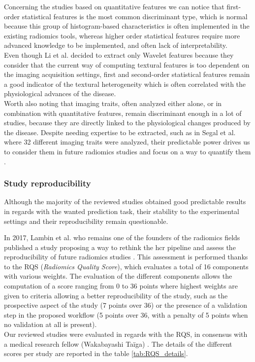 

Concerning the studies based on quantitative features we can notice that
first-order statistical features is the most common discriminant type,
which is normal because this group of histogram-based characteristics is
often implemented in the existing radiomics tools, whereas higher order
statistical features require more advanced knowledge to be implemented,
and often lack of interpretability. \\
Even though Li et al. \cite{Li2016} decided to extract only Wavelet features
because they consider that the current way of computing textural
features is too dependent on the imaging acquisition settings, first and
second-order statistical features remain a good indicator of the
textural heterogeneity which is often correlated with the physiological
advances of the disease.\\
Worth also noting that imaging traits, often analyzed either alone, or
in combination with quantitative features, remain discriminant enough in
a lot of studies, because they are directly linked to the physiological
changes produced by the disease. Despite needing expertise to be
extracted, such as in Segal et al. where 32 different imaging
traits were analyzed, their predictable power drives us to consider them
in future radiomics studies and focus on a way to quantify them \cite{Segal2007}.

\subsubsection{Study reproducibility}\label{study-reproducibility}

Although the majority of the reviewed studies obtained good predictable
results in regards with the wanted prediction task, their stability to
the experimental settings and their reproducibility remain questionable.

In 2017, Lambin et al. \cite{Lambin2017} who remains one of the founders of the
radiomics fields \cite{Lambin2012} published a study
proposing a way to rethink the \ac{hcr} pipeline and assess the reproducibility of
future radiomics studies . This
assessment is performed thanks to the RQS (\emph{Radiomics Quality
Score}), which evaluates a total of 16 components with various weights.
The evaluation of the different components allows the computation of a
score ranging from 0 to 36 points where highest weights are given to
criteria allowing a better reproducibility of the study, such as the
prospective aspect of the study (7 points over 36) or the presence of a
validation step in the proposed workflow (5 points over 36, with a
penalty of 5 points when no validation at all is present). \\
Our reviewed studies were evaluated in regards with the RQS, in
consensus with a medical research fellow (Wakabayashi Taïga) \cite{Wakabayashi2019}.
The details of the different scores per study are reported in the table \ref{tab:RQS_details}.

